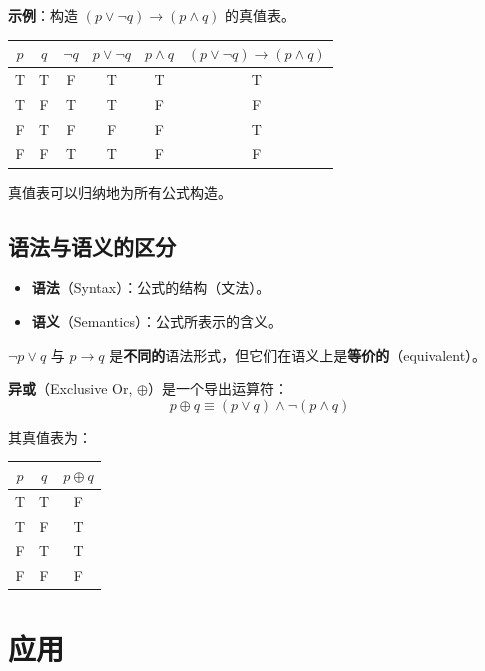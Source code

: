 \documentclass[UTF8,11pt,a4paper]{ctexbook}   %
\theoremstyle{definition}
\begin{document}
\textbf{示例}：构造 $(p \lor \neg q) \rightarrow (p \land q)$ 的真值表。

\begin{table}[htbp]
\centering
\begin{tabular}{|c|c|c|c|c|c|}
\hline
$p$ & $q$ & $\neg q$ & $p \lor \neg q$ & $p \land q$ & $(p \lor \neg q) \rightarrow (p \land q)$ \\
\hline
T & T & F & T & T & T \\
T & F & T & T & F & F \\
F & T & F & F & F & T \\
F & F & T & T & F & F \\
\hline
\end{tabular}
\end{table}

真值表可以归纳地为所有公式构造。

\subsection{语法与语义的区分}

\begin{itemize}
    \item \textbf{语法}（Syntax）：公式的结构（文法）。
    \item \textbf{语义}（Semantics）：公式所表示的含义。
\end{itemize}

$\neg p \lor q$ 与 $p \rightarrow q$ 是\textbf{不同的}语法形式，但它们在语义上是\textbf{等价的}（equivalent）。

\textbf{异或}（Exclusive Or, $\oplus$）是一个导出运算符：
\[
\boxed{p \oplus q \equiv (p \lor q) \land \neg (p \land q)}
\]

其真值表为：
\begin{table}[htbp]
\centering
\begin{tabular}{|c|c|c|}
\hline
$p$ & $q$ & $p \oplus q$ \\
\hline
T & T & F \\
T & F & T \\
F & T & T \\
F & F & F \\
\hline
\end{tabular}
\end{table}

\section{应用}
\end{document}

